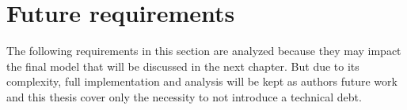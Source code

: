 





\section{Future requirements}

The following requirements in this section are analyzed because they may impact the final model that will be discussed in the next chapter. But due to its complexity, full implementation and analysis will be kept as authors future work and this thesis cover only the necessity to not introduce a technical debt.







